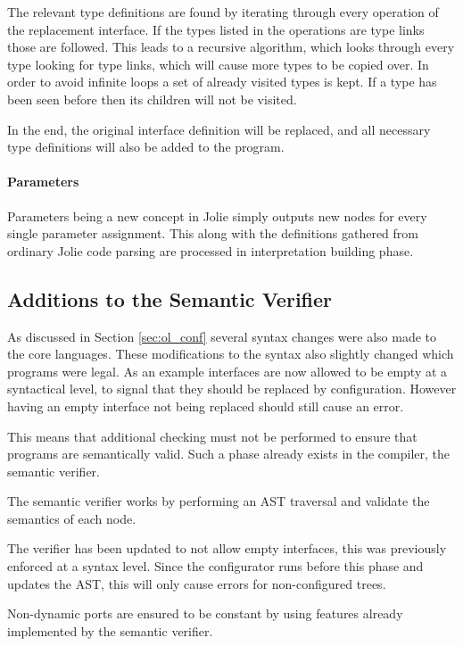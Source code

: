 The relevant type definitions are found by iterating through every operation of
the replacement interface. If the types listed in the operations are type links
those are followed. This leads to a recursive algorithm, which looks through
every type looking for type links, which will cause more types to be copied
over. In order to avoid infinite loops a set of already visited types is kept.
If a type has been seen before then its children will not be visited.

In the end, the original interface definition will be replaced, and all
necessary type definitions will also be added to the program.

\paragraph{Parameters}

Parameters being a new concept in Jolie simply outputs new nodes for every
single parameter assignment. This along with the definitions gathered from
ordinary Jolie code parsing are processed in interpretation building phase.

\subsection{Additions to the Semantic Verifier}

As discussed in Section \ref{sec:ol_conf} several syntax changes were also made
to the core languages. These modifications to the syntax also slightly changed
which programs were legal. As an example interfaces are now allowed to be empty
at a syntactical level, to signal that they should be replaced by
configuration. However having an empty interface not being replaced should
still cause an error.

This means that additional checking must not be performed to ensure that
programs are semantically valid. Such a phase already exists in the compiler,
the semantic verifier.

The semantic verifier works by performing an AST traversal and validate the
semantics of each node.

The verifier has been updated to not allow empty interfaces, this was
previously enforced at a syntax level. Since the configurator runs before this
phase and updates the AST, this will only cause errors for non-configured
trees.

Non-dynamic ports are ensured to be constant by using features already
implemented by the semantic verifier.

